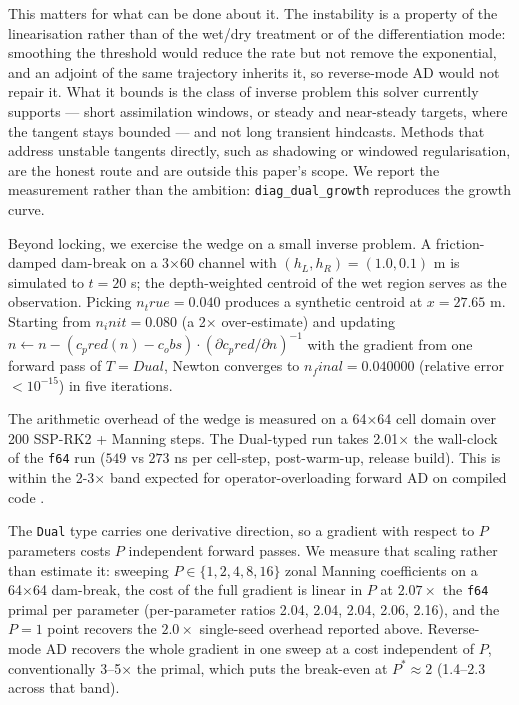 This matters for what can be done about it. The instability is a
property of the linearisation rather than of the wet/dry treatment or of
the differentiation mode: smoothing the threshold would reduce the rate
but not remove the exponential, and an adjoint of the same trajectory
inherits it, so reverse-mode AD would not repair it. What it bounds is
the class of inverse problem this solver currently supports --- short
assimilation windows, or steady and near-steady targets, where the
tangent stays bounded --- and not long transient hindcasts. Methods that
address unstable tangents directly, such as shadowing or windowed
regularisation, are the honest route and are outside this paper's scope.
We report the measurement rather than the ambition:
\texttt{diag\_dual\_growth} reproduces the growth curve.

Beyond locking, we exercise the wedge on a small inverse problem. A
friction-damped dam-break on a 3×60 channel with
\((h_L, h_R) = (1.0, 0.1)\) m is simulated to \(t = 20\) s; the
depth-weighted centroid of the wet region serves as the observation.
Picking \(n_true = 0.040\) produces a synthetic centroid at
\(x = 27.65\) m. Starting from \(n_init = 0.080\) (a 2× over-estimate)
and updating
\(n \leftarrow n - (c_pred(n) - c_obs) \cdot (\partial c_pred/\partial n)^{-1}\)
with the gradient from one forward pass of \(T = Dual\), Newton
converges to \(n_final = 0.040 000\) (relative error \(< 10^{-15}\)) in
five iterations.

The arithmetic overhead of the wedge is measured on a 64×64 cell domain
over 200 SSP-RK2 + Manning steps. The Dual-typed run takes 2.01× the
wall-clock of the \texttt{f64} run (\(549\) vs \(273\) ns per cell-step,
post-warm-up, release build). This is within the 2-3× band expected for
operator-overloading forward AD on compiled code
\citep{Griewank2008, Sagebaum2019CoDiPack}.

The \texttt{Dual} type carries one derivative direction, so a gradient
with respect to \(P\) parameters costs \(P\) independent forward passes.
We measure that scaling rather than estimate it: sweeping
\(P \in \{1, 2, 4, 8, 16\}\) zonal Manning coefficients on a 64×64
dam-break, the cost of the full gradient is linear in \(P\) at
\(2.07\times\) the \texttt{f64} primal per parameter (per-parameter
ratios 2.04, 2.04, 2.04, 2.06, 2.16), and the \(P = 1\) point recovers
the \(2.0\times\) single-seed overhead reported above. Reverse-mode AD
recovers the whole gradient in one sweep at a cost independent of \(P\),
conventionally 3--5× the primal, which puts the break-even at
\(P^{*} \approx 2\) (1.4--2.3 across that band).

